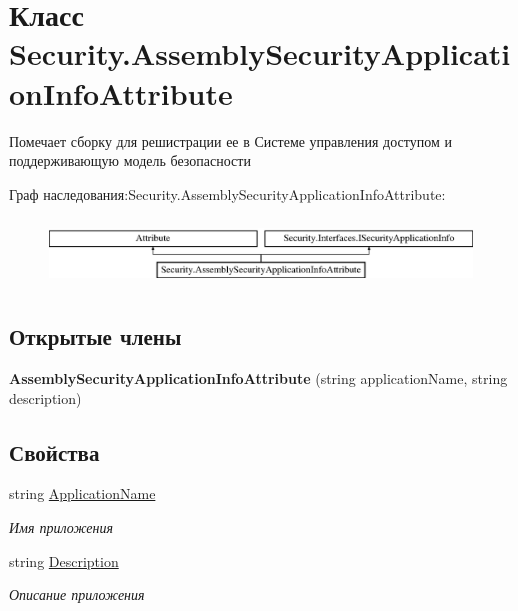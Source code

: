 \hypertarget{class_security_1_1_assembly_security_application_info_attribute}{}\section{Класс Security.\+Assembly\+Security\+Application\+Info\+Attribute}
\label{class_security_1_1_assembly_security_application_info_attribute}


Помечает сборку для решистрации ее в Системе управления доступом и поддерживающую модель безопасности  


Граф наследования\+:Security.\+Assembly\+Security\+Application\+Info\+Attribute\+:\begin{figure}[H]
\begin{center}
\leavevmode
\includegraphics[height=1.848185cm]{da/da8/class_security_1_1_assembly_security_application_info_attribute}
\end{center}
\end{figure}
\subsection*{Открытые члены}
\begin{DoxyCompactItemize}
\item 
\mbox{\label{class_security_1_1_assembly_security_application_info_attribute_a41cba380cf3a2c21d5ca60e5c19f2c93}} 
{\bfseries Assembly\+Security\+Application\+Info\+Attribute} (string application\+Name, string description)
\end{DoxyCompactItemize}
\subsection*{Свойства}
\begin{DoxyCompactItemize}
\item 
string \hyperlink{class_security_1_1_assembly_security_application_info_attribute_a4aafc167a63fdf7ebb8a883d12f059b4}{Application\+Name}
\begin{DoxyCompactList}\small\item\em Имя приложения \end{DoxyCompactList}\item 
string \hyperlink{class_security_1_1_assembly_security_application_info_attribute_a9cf1166c3752f62b81696e2829de7445}{Description}
\begin{DoxyCompactList}\small\item\em Описание приложения \end{DoxyCompactList}\end{DoxyCompactItemize}


